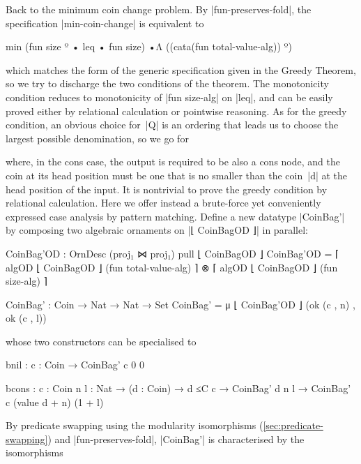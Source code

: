 Back to the minimum coin change problem.
By |fun-preserves-fold|, the specification |min-coin-change| is equivalent to
\begin{code}
min (fun size º • leq • fun size) •Λ ((cata(fun total-value-alg)) º)
\end{code}
which matches the form of the generic specification given in the Greedy Theorem, so we try to discharge the two conditions of the theorem.
The monotonicity condition reduces to monotonicity of |fun size-alg| on |leq|, and can be easily proved either by relational calculation or pointwise reasoning.
As for the greedy condition, an obvious choice for~|Q| is an ordering that leads us to choose the largest possible denomination, so we go for
where, in the cons case, the output is required to be also a cons node, and the coin at its head position must be one that is no smaller than the coin~|d| at the head position of the input.
It is nontrivial to prove the greedy condition by relational calculation.
Here we offer instead a brute-force yet conveniently expressed case analysis by pattern matching.
Define a new datatype |CoinBag'| by composing two algebraic ornaments on |⌊ CoinBagOD ⌋| in parallel:
\begin{code}
CoinBag'OD : OrnDesc (proj₁ ⋈ proj₁) pull ⌊ CoinBagOD ⌋
CoinBag'OD =  ⌈ algOD ⌊ CoinBagOD ⌋ (fun total-value-alg) ⌉ ⊗
              ⌈ algOD ⌊ CoinBagOD ⌋ (fun size-alg) ⌉

CoinBag' : Coin → Nat → Nat → Set
CoinBag' = μ ⌊ CoinBag'OD ⌋ (ok (c , n) , ok (c , l))
\end{code}
whose two constructors can be specialised to
\begin{code}
bnil   :  {c : Coin} → CoinBag' c 0 0

bcons  :  {c : Coin} {n l : Nat} → (d : Coin) → d ≤C c →
          CoinBag' d n l → CoinBag' c (value d + n) (1 + l)
\end{code}
By predicate swapping using the modularity isomorphisms (\autoref{sec:predicate-swapping}) and |fun-preserves-fold|, |CoinBag'| is characterised by the isomorphisms
